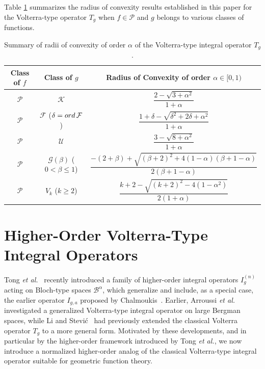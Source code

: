 \documentclass[12pt,a4paper]{amsart}
\numberwithin{equation}{section}
\theoremstyle{remark}
\begin{document}


Table \ref{tab:radii} summarizes the radius of convexity results established in this paper for the Volterra-type operator $T_g$ when $f \in \mathcal{P}$ and $g$ belongs to various classes of functions.
 

\begin{table}[h!]
\centering
\begin{tabular}{|c|c|c|}
\hline
\textbf{Class of $f$} & \textbf{Class of $g$} & \textbf{Radius of Convexity of order $\alpha\in[0,1)$} \\
\hline
$\mathcal{P}$  & $\mathcal{K}$ & $\dfrac{2-\sqrt{3+\alpha^2}}{1+\alpha}$\\
\hline
$\mathcal{P}$ & $ \mathcal{F}$ ($\delta={\rm ord}\,\mathcal{F}$) & $\dfrac{1+\delta-\sqrt{\delta^2+2\delta+\alpha^2}}{1+\alpha}$ \\
\hline
$\mathcal{P}$ & $\mathcal{U}$  & $\dfrac{3-\sqrt{8+\alpha^2}}{1+\alpha}$ \\
\hline
$\mathcal{P}$ & $\mathcal{G}(\beta)$ ($0<\beta\le 1$) & $\dfrac{-(2+\beta)+\sqrt{(\beta+2)^2+4(1-\alpha)(\beta+1-\alpha)}}{2(\beta+1-\alpha)}$ \\
\hline
$\mathcal{P}$ & $V_k$ ($k\ge 2$) & $\dfrac{k+2-\sqrt{(k+2)^2-4(1-\alpha^2)}}{2(1+\alpha)}$ \\
\hline
\end{tabular}
\caption{Summary of radii of convexity of order $\alpha$ of the Volterra-type integral operator $T_g$.}
\label{tab:radii}
\end{table}



\section{Higher-Order Volterra-Type Integral Operators}\label{sec:higher-order}

Tong \emph{et al.}~\cite{Tong} recently introduced a family of higher-order integral operators \(I^{(n)}_g\) acting on Bloch-type spaces \(\mathcal{B}^{\alpha}\), which generalize and include, as a special case, the earlier operator \(I_{g,a}\) proposed by Chalmoukis~\cite{Chal}. 
Earlier, Arroussi \emph{et al.}~\cite{Arro} investigated a generalized Volterra-type integral operator on large Bergman spaces, while Li and Stevi\'{c}~\cite{Li-S} had previously extended the classical Volterra operator \(T_g\) to a more general form. 
Motivated by these developments, and in particular by the higher-order framework introduced by Tong \emph{et al.}, we now introduce a normalized higher-order analog of the classical Volterra-type integral operator suitable for geometric function theory.
\end{document}
